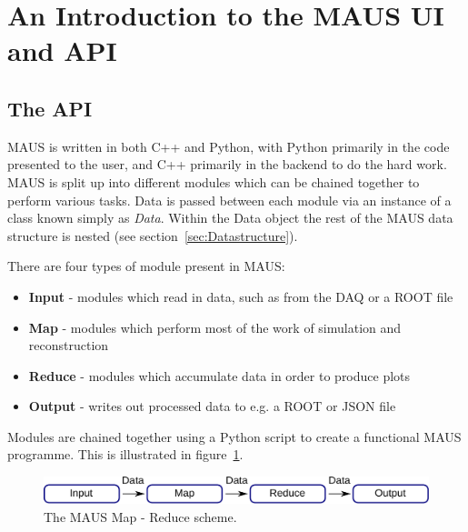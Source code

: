 \documentclass[a4paper,10pt]{article}
\begin{document}
\section{An Introduction to the MAUS UI and API}
\label{sec:API}
  \subsection{The API}
    MAUS is written in both C++ and Python, with Python primarily in the code presented to the user, and C++ primarily in the backend to do the hard work.  MAUS is split up into different modules which can be chained together to perform various tasks. Data is passed between each module via an instance of a class known simply as \textit{Data}. Within the Data object the rest of the MAUS data structure is nested (see section~\ref{sec:Datastructure}). 

    There are four types of module present in MAUS:
    \begin{itemize}
      \item \textbf{Input} - modules which read in data, such as from the DAQ or a ROOT file
      \item \textbf{Map} - modules which perform most of the work of simulation and reconstruction
      \item \textbf{Reduce} - modules which accumulate data in order to produce plots
      \item \textbf{Output} - writes out processed data to e.g. a ROOT or JSON file 
    \end{itemize}
    \noindent
    Modules are chained together using a Python script to create a functional MAUS programme.  This is illustrated in figure~\ref{fig:MapReduce}.
    
    \begin{figure}[h]
      \begin{center}
        \includegraphics[width=0.8\linewidth]{./graphics/map-reduce.pdf}
        \caption{The MAUS Map - Reduce scheme.}
        \label{fig:MapReduce}
      \end{center}
    \end{figure}
\end{document}
